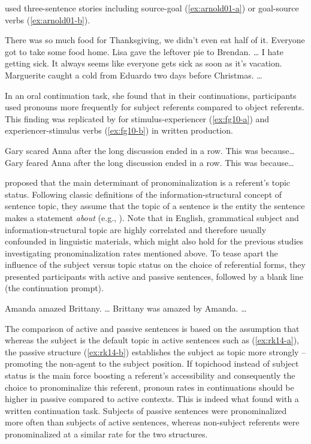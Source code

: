 \documentclass[output=paper,colorlinks,citecolor=brown]{langscibook}
\begin{document}
\citet[141]{Arnold-01} used three-sentence stories including source-goal (\ref{ex:arnold01-a}) or goal-source verbs (\ref{ex:arnold01-b}).

\ea \ea There was so much food for Thanksgiving, we didn’t even eat half of it.
        Everyone got to take some food home. Lisa gave the leftover pie to Brendan. \ldots \label{ex:arnold01-a}
    \ex I hate getting sick. It always seems like everyone gets sick as soon as it’s vacation. 
        Marguerite caught a cold from Eduardo two days before Christmas. \ldots \label{ex:arnold01-b}
\z\z

 In an oral continuation task, she found that in their continuations, participants used pronouns more frequently for subject referents compared to object referents. This finding was replicated by \citet{Fukumura::van_Gompel-10} for stimulus-experiencer (\ref{ex:fg10-a}) and experiencer-stimulus verbs (\ref{ex:fg10-b}) in written production.

\ea\label{ex:fg10} \ea Gary scared Anna after the long discussion ended in a row. This was because\ldots \label{ex:fg10-a}
    \ex Gary feared Anna after the long discussion ended in a row. This was because\ldots \label{ex:fg10-b}
\z\z 


\citet{Rohde::Kehler-14} proposed that the main determinant of pronominalization is a referent's topic status. Following classic definitions of the information-structural concept of sentence topic, they assume that the topic of a sentence is the entity the sentence makes a statement \textit{about} (e.g., \citealt{Reinhart-81, Lambrecht-96-book}). Note that in English, grammatical subject and information-structural topic are highly correlated and therefore usually confounded in linguistic materials, which might also hold for the previous studies investigating pronominalization rates mentioned above.
To tease apart the influence of the subject versus topic status on the choice of referential forms, they presented participants with active and passive sentences, followed by a blank line (the continuation prompt).

\ea \ea Amanda amazed Brittany. \ldots \label{ex:rk14-a}
    \ex Brittany was amazed by Amanda. \ldots \label{ex:rk14-b}
\z\z

The comparison of active and passive sentences is based on the assumption that whereas the subject is the default topic in active sentences such as (\ref{ex:rk14-a}), the passive structure (\ref{ex:rk14-b}) establishes the subject as topic more strongly -- promoting the non-agent to the subject position. If topichood instead of subject status is the main force boosting a referent's accessibility and consequently the choice to pronominalize this referent, pronoun rates in continuations should be higher in passive compared to active contexts. This is indeed what \citet{Rohde::Kehler-14} found with a written continuation task. Subjects of passive sentences were pronominalized more often than subjects of active sentences, whereas non-subject referents were pronominalized at a similar rate for the two structures.
\end{document}

